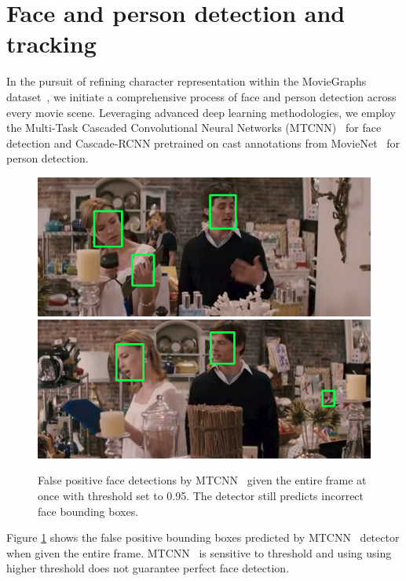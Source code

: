 \section{Face and person detection and tracking}
\label{subsec:face_tracking}
In the pursuit of refining character representation within the MovieGraphs dataset~\cite{moviegraphs}, we initiate a comprehensive process of face and person detection across every movie scene. Leveraging advanced deep learning methodologies, we employ the Multi-Task Cascaded Convolutional Neural Networks (MTCNN)~\cite{mtcnn} for face detection and Cascade-RCNN pretrained on cast annotations from MovieNet~\cite{movienet} for person detection.

\begin{figure}[t]
\centering
\includegraphics[width=0.49\linewidth]{Figures/falsePositive_face_1.png}
\includegraphics[width=0.49\linewidth]{Figures/falsePositive_face_2.png}
\vspace{-2mm}
\caption{False positive face detections by MTCNN~\cite{mtcnn} given the entire frame at once with threshold set to 0.95. The detector still predicts incorrect face bounding boxes.}
\vspace{-4mm}
\label{fig:falsePositiveFaces}
\end{figure}

Figure \ref{fig:falsePositiveFaces} shows the false positive bounding boxes predicted by MTCNN~\cite{mtcnn} detector when given the entire frame. MTCNN~\cite{mtcnn} is sensitive to threshold and using using higher threshold does not guarantee perfect face detection.

